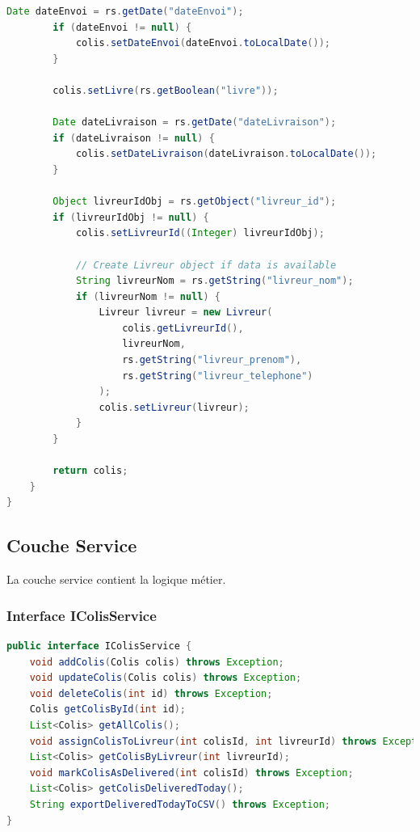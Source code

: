\documentclass{rapportENSIAS}
\begin{document}
\begin{lstlisting}[language=Java, caption=Impl\'{e}mentation ColisDAOImpl compl\`{e}te]
        Date dateEnvoi = rs.getDate("dateEnvoi");
        if (dateEnvoi != null) {
            colis.setDateEnvoi(dateEnvoi.toLocalDate());
        }
        
        colis.setLivre(rs.getBoolean("livre"));
        
        Date dateLivraison = rs.getDate("dateLivraison");
        if (dateLivraison != null) {
            colis.setDateLivraison(dateLivraison.toLocalDate());
        }
        
        Object livreurIdObj = rs.getObject("livreur_id");
        if (livreurIdObj != null) {
            colis.setLivreurId((Integer) livreurIdObj);
            
            // Create Livreur object if data is available
            String livreurNom = rs.getString("livreur_nom");
            if (livreurNom != null) {
                Livreur livreur = new Livreur(
                    colis.getLivreurId(),
                    livreurNom,
                    rs.getString("livreur_prenom"),
                    rs.getString("livreur_telephone")
                );
                colis.setLivreur(livreur);
            }
        }
        
        return colis;
    }
}
\end{lstlisting}

\subsection{Couche Service}

La couche service contient la logique m\'{e}tier.

\subsubsection{Interface IColisService}

\begin{lstlisting}[language=Java, caption=Interface IColisService]
public interface IColisService {
    void addColis(Colis colis) throws Exception;
    void updateColis(Colis colis) throws Exception;
    void deleteColis(int id) throws Exception;
    Colis getColisById(int id);
    List<Colis> getAllColis();
    void assignColisToLivreur(int colisId, int livreurId) throws Exception;
    List<Colis> getColisByLivreur(int livreurId);
    void markColisAsDelivered(int colisId) throws Exception;
    List<Colis> getColisDeliveredToday();
    String exportDeliveredTodayToCSV() throws Exception;
}
\end{lstlisting}
\end{document}
